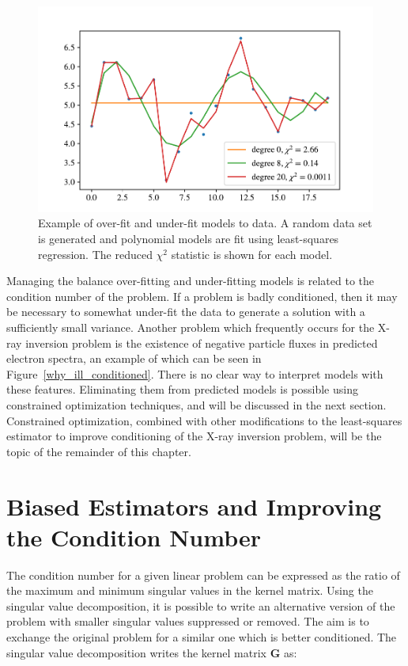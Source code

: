 \begin{figure}[p]
    \centering
    \includegraphics[width=1.0\textwidth]{figures/chapter_4/overunderfit_example/overfit_underfit.pdf}
    \caption{Example of over-fit and under-fit models to data. A random data set is generated and polynomial models are fit using least-squares regression. The reduced $\chi^2$ statistic is shown for each model.}
    \label{overunderfit_example}
\end{figure}

Managing the balance over-fitting and under-fitting models is related to the condition number of the problem. If a problem is badly conditioned, then it may be necessary to somewhat under-fit the data to generate a solution with a sufficiently small variance. Another problem which frequently occurs for the X-ray inversion problem is the existence of negative particle fluxes in predicted electron spectra, an example of which can be seen in Figure~\ref{why_ill_conditioned}. There is no clear way to interpret models with these features. Eliminating them from predicted models is possible using constrained optimization techniques, and will be discussed in the next section. Constrained optimization, combined with other modifications to the least-squares estimator to improve conditioning of the X-ray inversion problem, will be the topic of the remainder of this chapter. 

\section{Biased Estimators and Improving the Condition Number}

The condition number for a given linear problem can be expressed as the ratio of the maximum and minimum singular values in the kernel matrix.  Using the singular value decomposition, it is possible to write an alternative version of the problem with smaller singular values suppressed or removed. The aim is to exchange the original problem for a similar one which is better conditioned. The singular value decomposition writes the kernel matrix $\mathbf{G}$ as:


